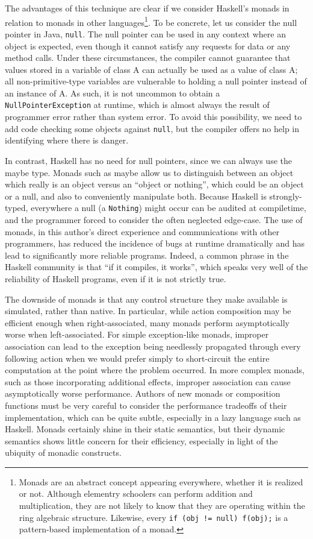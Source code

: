 \documentclass[11pt]{article}
\begin{document}
The advantages of this technique are clear if we consider Haskell's monads in relation to monads in other languages\footnote{Monads are an abstract concept appearing everywhere, whether it is realized or not. Although elementry schoolers can perform addition and multiplication, they are not likely to know that they are operating within the ring algebraic structure. Likewise, every \texttt{if (obj != null) f(obj);} is a pattern-based implementation of a monad.}.
To be concrete, let us consider the null pointer in Java, \texttt{null}.
The null pointer can be used in any context where an object is expected, even though it cannot satisfy any requests for data or any method calls.
Under these circumstances, the compiler cannot guarantee that values stored in a variable of class A can actually be used as a value of class A; all non-primitive-type variables are vulnerable to holding a null pointer instead of an instance of A.
As such, it is not uncommon to obtain a \texttt{NullPointerException} at runtime, which is almost always the result of programmer error rather than system error.
To avoid this possibility, we need to add code checking some objects against \texttt{null}, but the compiler offers no help in identifying where there is danger.

In contrast, Haskell has no need for null pointers, since we can always use the maybe type.
Monads such as maybe allow us to distinguish between an object which really is an object versus an ``object or nothing'', which could be an object or a null, and also to conveniently manipulate both.
Because Haskell is strongly-typed, everywhere a null (a \texttt{Nothing}) might occur can be audited at compiletime, and the programmer forced to consider the often neglected edge-case.
The use of monads, in this author's direct experience and communications with other programmers, has reduced the incidence of bugs at runtime dramatically and has lead to significantly more reliable programs.
Indeed, a common phrase in the Haskell community is that ``if it compiles, it works'', which speaks very well of the reliability of Haskell programs, even if it is not strictly true.


The downside of monads is that any control structure they make available is simulated, rather than native.
In particular, while action composition may be efficient enough when right-associated, many monads perform asymptotically worse when left-associated.\cite{ReflectionWithoutRemorse}
For simple exception-like monads, improper association can lead to the exception being needlessly propagated through every following action when we would prefer simply to short-circuit the entire computation at the point where the problem occurred.
In more complex monads, such as those incorporating additional effects, improper association can cause asymptotically worse performance.
Authors of new monads or composition functions must be very careful to consider the performance tradeoffs of their implementation, which can be quite subtle, especially in a lazy language such as Haskell.
Monads certainly shine in their static semantics, but their dynamic semantics shows little concern for their efficiency, especially in light of the ubiquity of monadic constructs.
\end{document}
